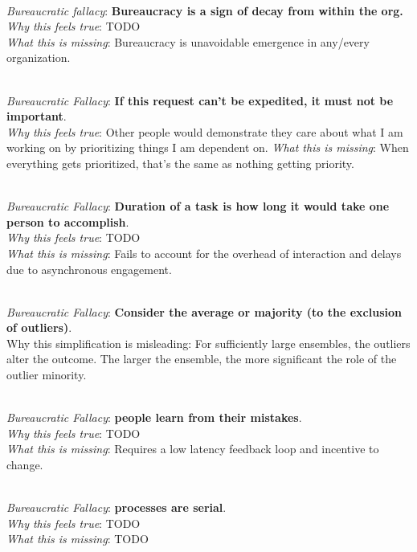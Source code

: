 \ \\

\textit{Bureaucratic fallacy}: \textbf{Bureaucracy is a sign of decay from within the org.} \\
\textit{Why this feels true}: TODO\\
\textit{What this is missing}: Bureaucracy is unavoidable emergence in any/every organization.

\ \\

\textit{Bureaucratic Fallacy}: \textbf{If this request can't be expedited, it must not be important}.  \\
\textit{Why this feels true}: Other people would demonstrate they care about what I am working on by prioritizing things I am dependent on.
\textit{What this is missing}: When everything gets prioritized, that's the same as nothing getting priority.

\ \\

\textit{Bureaucratic Fallacy}: \textbf{Duration of a task is how long it would take one person to accomplish}.  \\
\textit{Why this feels true}: TODO\\
\textit{What this is missing}: Fails to account for the overhead of interaction and delays due to asynchronous engagement.


\ \\

\textit{Bureaucratic Fallacy}: \textbf{Consider the average or majority (to the exclusion of outliers)}. \\
Why this simplification is misleading: For sufficiently large ensembles, the outliers alter the outcome. The larger the ensemble, the more significant the role of the outlier minority.

\ \\

\textit{Bureaucratic Fallacy}: \textbf{people learn from their mistakes}. \\
\textit{Why this feels true}: TODO\\
\textit{What this is missing}: Requires a low latency feedback loop and incentive to change.

\ \\

\textit{Bureaucratic Fallacy}: \textbf{processes are serial}.\\
\textit{Why this feels true}: TODO \\
\textit{What this is missing}: TODO


